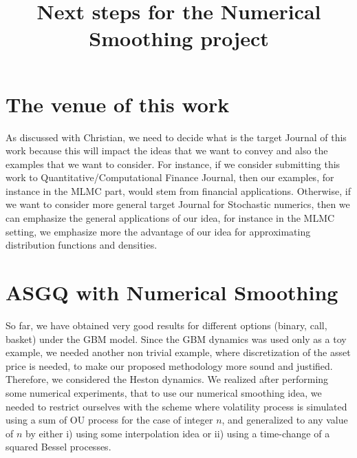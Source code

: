 \documentclass[11pt]{article}
\title{Next steps for the Numerical Smoothing project}
\begin{document}
\maketitle







\thispagestyle{plain}

\setcounter{tocdepth}{1}
\section{The venue of this work}\label{sec:The venue of this work}
As discussed with Christian, we need to decide what is the target Journal of this work because this will impact the ideas that we want to convey and also the examples that we want to consider. For instance, if we consider submitting this work to Quantitative/Computational Finance Journal, then our examples, for instance in the MLMC part, would stem from financial applications. Otherwise, if we want to consider more general target Journal for Stochastic numerics, then we can emphasize the general applications of our idea, for instance in the MLMC setting, we emphasize more the advantage of our idea for approximating distribution functions and densities. 
\section{ASGQ with Numerical Smoothing}\label{sec:ASGQ with Numerical Smoothing}
So far, we have obtained very good results for different options (binary, call, basket) under the GBM model. Since the GBM dynamics was used only as a toy example, we needed another non trivial example, where discretization of the  asset price is needed, to make our proposed methodology more sound and justified. Therefore, we considered the Heston dynamics. We realized after performing some numerical experiments, that to use our numerical smoothing idea, we needed to restrict ourselves with the scheme where volatility process is simulated using a sum of OU process for the case of integer $n$, and generalized to any value of $n$ by either i) using some interpolation idea or  ii) using  a time-change of a squared Bessel processes.
\end{document}
